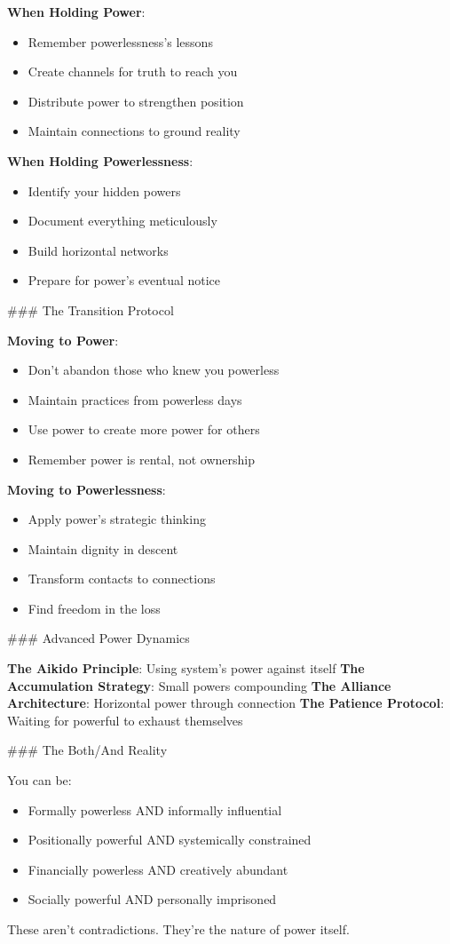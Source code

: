 \documentclass[12pt]{book}
\begin{document}
\textbf{When Holding Power}:
\begin{itemize}
\item Remember powerlessness's lessons
\item Create channels for truth to reach you
\item Distribute power to strengthen position
\item Maintain connections to ground reality

\end{itemize}
\textbf{When Holding Powerlessness}:
\begin{itemize}
\item Identify your hidden powers
\item Document everything meticulously
\item Build horizontal networks
\item Prepare for power's eventual notice

\end{itemize}
\#\#\# The Transition Protocol

\textbf{Moving to Power}:
\begin{itemize}
\item Don't abandon those who knew you powerless
\item Maintain practices from powerless days
\item Use power to create more power for others
\item Remember power is rental, not ownership

\end{itemize}
\textbf{Moving to Powerlessness}:
\begin{itemize}
\item Apply power's strategic thinking
\item Maintain dignity in descent
\item Transform contacts to connections
\item Find freedom in the loss

\end{itemize}
\#\#\# Advanced Power Dynamics

\textbf{The Aikido Principle}: Using system's power against itself
\textbf{The Accumulation Strategy}: Small powers compounding
\textbf{The Alliance Architecture}: Horizontal power through connection
\textbf{The Patience Protocol}: Waiting for powerful to exhaust themselves

\#\#\# The Both/And Reality

You can be:
\begin{itemize}
\item Formally powerless AND informally influential
\item Positionally powerful AND systemically constrained
\item Financially powerless AND creatively abundant
\item Socially powerful AND personally imprisoned

\end{itemize}
These aren't contradictions. They're the nature of power itself.
\end{document}
